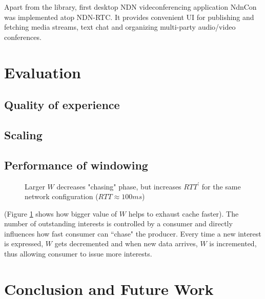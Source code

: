 \documentclass{icn/sig-alternate-2012} %
\newcommand{\ndnrtcName}{NDN-RTC} %
\newcommand{\ndnconName}{NdnCon}
\begin{document}
Apart from the library, first desktop NDN videconferencing application \ndnconName{} \cite{ndncon} was implemented atop \ndnrtcName{}. It provides convenient UI for publishing and fetching media streams, text chat and organizing multi-party audio/video conferences.

\section{Evaluation}
\label{sec:eval} 

\subsection{Quality of experience} 

\subsection{Scaling}

\subsection{Performance of windowing}
\begin{figure}[t!]
\centering
\begin{scriptsize}
\end{scriptsize}
\caption{Larger $W$ decreases "chasing" phase, but increases $RTT^\prime$ for the same network configuration ($RTT\approx100ms$)}
\label{fig:ws}
\end{figure}

(Figure \ref{fig:ws} shows how bigger value of $W$ helps to exhaust cache faster). The number of outstanding interests is controlled by a consumer and directly influences how fast consumer can ``chase" the producer. Every time a new interest is expressed, $W$ gets decremented and when new data arrives, $W$ is incremented, thus allowing consumer to issue more interests.



\section{Conclusion and Future Work}
\label{sec:conclusion}
\end{document}
